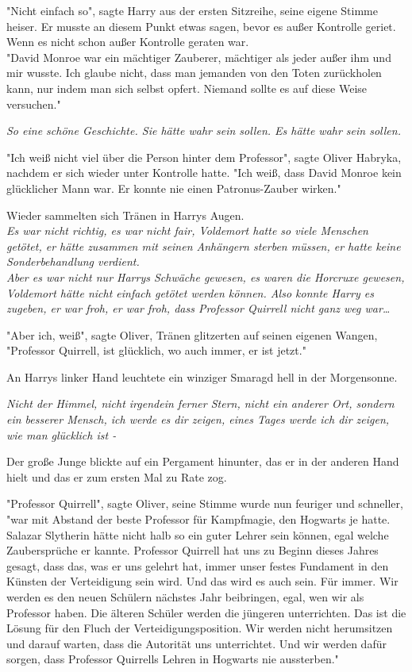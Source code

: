 {"Nicht einfach so", sagte Harry aus der ersten Sitzreihe, seine eigene Stimme heiser. Er musste an diesem Punkt etwas sagen, bevor es außer Kontrolle geriet. Wenn es nicht schon außer Kontrolle geraten war.\\ "David Monroe war ein mächtiger Zauberer, mächtiger als jeder außer ihm und mir wusste. Ich glaube nicht, dass man jemanden von den Toten zurückholen kann, nur indem man sich selbst opfert. Niemand sollte es auf diese Weise versuchen."

\emph{So eine schöne Geschichte. Sie hätte wahr sein sollen. Es hätte wahr sein sollen.}

"Ich weiß nicht viel über die Person hinter dem Professor", sagte Oliver Habryka, nachdem er sich wieder unter Kontrolle hatte. "Ich weiß, dass David Monroe kein glücklicher Mann war. Er konnte nie einen Patronus-Zauber wirken."

Wieder sammelten sich Tränen in Harrys Augen.\\ \emph{Es war nicht richtig, es war nicht fair, Voldemort hatte so viele Menschen getötet, er hätte zusammen mit seinen Anhängern sterben müssen, er hatte keine Sonderbehandlung verdient.}\\ \emph{Aber es war nicht nur Harrys Schwäche gewesen, es waren die Horcruxe gewesen, Voldemort hätte nicht einfach getötet werden können. Also konnte Harry es zugeben, er war froh, er war froh, dass Professor Quirrell nicht ganz weg war…}

"Aber ich, weiß", sagte Oliver, Tränen glitzerten auf seinen eigenen Wangen, "Professor Quirrell, ist glücklich, wo auch immer, er ist jetzt."

An Harrys linker Hand leuchtete ein winziger Smaragd hell in der Morgensonne.

\emph{Nicht der Himmel, nicht irgendein ferner Stern, nicht ein anderer Ort, sondern ein besserer Mensch, ich werde es dir zeigen, eines Tages werde ich dir zeigen, wie man glücklich ist -}

Der große Junge blickte auf ein Pergament hinunter, das er in der anderen Hand hielt und das er zum ersten Mal zu Rate zog.

"Professor Quirrell", sagte Oliver, seine Stimme wurde nun feuriger und schneller, "war mit Abstand der beste Professor für Kampfmagie, den Hogwarts je hatte. Salazar Slytherin hätte nicht halb so ein guter Lehrer sein können, egal welche Zaubersprüche er kannte. Professor Quirrell hat uns zu Beginn dieses Jahres gesagt, dass das, was er uns gelehrt hat, immer unser festes Fundament in den Künsten der Verteidigung sein wird. Und das wird es auch sein. Für immer. Wir werden es den neuen Schülern nächstes Jahr beibringen, egal, wen wir als Professor haben. Die älteren Schüler werden die jüngeren unterrichten. Das ist die Lösung für den Fluch der Verteidigungsposition. Wir werden nicht herumsitzen und darauf warten, dass die Autorität uns unterrichtet. Und wir werden dafür sorgen, dass Professor Quirrells Lehren in Hogwarts nie aussterben."

}
